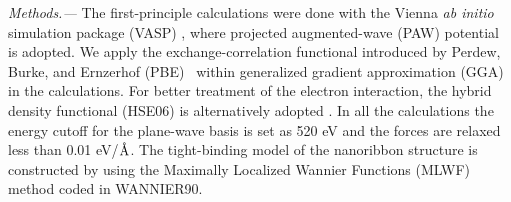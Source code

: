 \documentclass[twocolumn,english,prb,showpacs]{revtex4-1}
\begin{document}
\noindent\textit{Methods.---}
The first-principle calculations were done with the Vienna \emph{ab initio} simulation package (VASP) \cite{VASP}, where projected augmented-wave (PAW) potential is adopted. \cite{PAW_Blochl,PAW_Kresse_1999} We apply the exchange-correlation functional introduced by Perdew, Burke, and Ernzerhof (PBE)~\cite{PBE} within generalized gradient approximation (GGA) in the calculations. For better treatment of the electron interaction, the hybrid density functional (HSE06) is alternatively adopted \cite{HSE06}. In all the calculations the energy cutoff for the plane-wave basis is set as 520 eV and the forces are relaxed less than 0.01 eV/$\rm \text{\AA}$. The tight-binding model of the nanoribbon structure is constructed by using the Maximally Localized Wannier Functions (MLWF) method coded in WANNIER90.\cite{Wannier90}
\end{document}
